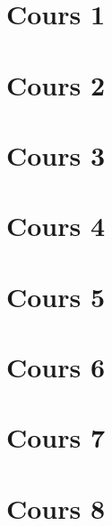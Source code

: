 \documentclass[11pt]{article}
\begin{document}
\section*{Cours 1}
\pagebreak

\section*{Cours 2}
\pagebreak

\section*{Cours 3}
\pagebreak

\section*{Cours 4}
\pagebreak

\section*{Cours 5}
\pagebreak

\section*{Cours 6}
\pagebreak

\section*{Cours 7}
\pagebreak

\section*{Cours 8}
\pagebreak
\end{document}
